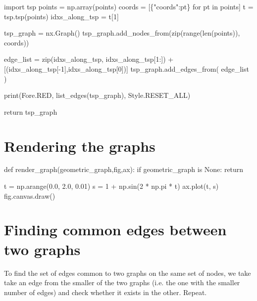      import tsp
     points = np.array(points)
     coords = [\{"coords":pt\} for pt in points]
     t      = tsp.tsp(points)
     idxs_along_tsp = t[1]


     tsp_graph = nx.Graph()
     tsp_graph.add_nodes_from(zip(range(len(points)), coords))

     edge_list = zip(idxs_along_tsp, idxs_along_tsp[1:]) + [(idxs_along_tsp[-1],idxs_along_tsp[0])]
     tsp_graph.add_edges_from(  edge_list  )

     print(Fore.RED, list_edges(tsp_graph), Style.RESET_ALL)

     return tsp_graph
\nwendcode{}\nwdocspar



\section{Rendering the graphs}


\nwenddocs{}\plusendmoddef\nwstartdeflinemarkup{}\nwenddeflinemarkup
def render_graph(geometric_graph,fig,ax):
     if geometric_graph is None:
            return

     t = np.arange(0.0, 2.0, 0.01)
     s = 1 + np.sin(2 * np.pi * t)
     ax.plot(t, s)
     fig.canvas.draw()
\nwendcode{}\nwdocspar


\section{Finding common edges between two graphs}

To find the set of edges common to two graphs on the same set of nodes, we take take 
an edge from the smaller of the two graphs (i.e. the one with the smaller number of edges) and check 
whether it exists in the other. Repeat. 

 

\nwenddocs{}\endmoddef\nwstartdeflinemarkup{}\nwenddeflinemarkup

